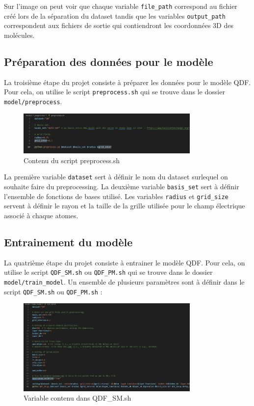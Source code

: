 Sur l'image on peut voir que chaque variable \texttt{file\_path} correspond au fichier créé lors de la séparation du dataset tandis que les variables \texttt{output\_path} correspondent aux fichiers de sortie qui contiendront les coordonnées 3D des molécules.

\subsection{Préparation des données pour le modèle} 

La troisième étape du projet consiste à préparer les données pour le modèle QDF. Pour cela, on utilise le script \texttt{preprocess.sh} qui se trouve dans le dossier \texttt{model/preprocess}.

\begin{figure}[H]
    \centering
    \includegraphics[width=0.8\textwidth]{GuideUtilisateur/preprocess1.png}
    \caption{Contenu du script preprocess.sh}
\end{figure}

La première variable \texttt{dataset} sert à définir le nom du dataset surlequel on souhaite faire du preprocessing. 
La deuxième variable \texttt{basis\_set} sert à définir l'ensemble de fonctions de bases utilisé.
Les variables \texttt{radius} et \texttt{grid\_size} servent à définir le rayon et la taille de la grille utilisée pour le champ électrique associé à chaque atomes.

\subsection{Entrainement du modèle}

La quatrième étape du projet consiste à entrainer le modèle QDF. Pour cela, on utilise le script \texttt{QDF\_SM.sh} ou \texttt{QDF\_PM.sh} qui se trouve dans le dossier \texttt{model/train\_model}.
Un ensemble de plusieurs paramètres sont à définir dans le script \texttt{QDF\_SM.sh} ou \texttt{QDF\_PM.sh} :

\begin{figure}[H]
    \centering
    \includegraphics[width=0.8\textwidth]{GuideUtilisateur/train1.png}
    \caption{Variable contenu dans QDF\_SM.sh}
\end{figure}

